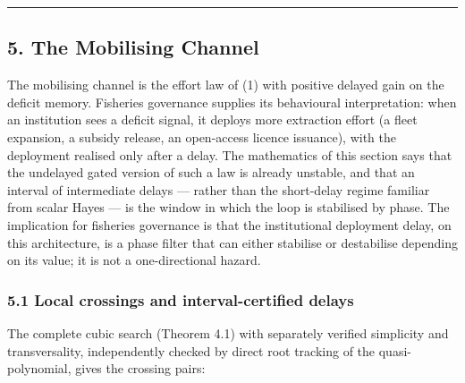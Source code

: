 \documentclass[11pt]{article}
\begin{document}
\begin{center}\rule{0.5\linewidth}{0.5pt}\end{center}

\subsection{5. The Mobilising Channel}\label{the-mobilising-channel}

The mobilising channel is the effort law of (1) with positive delayed
gain on the deficit memory. Fisheries governance supplies its
behavioural interpretation: when an institution sees a deficit signal,
it deploys more extraction effort (a fleet expansion, a subsidy release,
an open-access licence issuance), with the deployment realised only
after a delay. The mathematics of this section says that the undelayed
gated version of such a law is already unstable, and that an interval of
intermediate delays --- rather than the short-delay regime familiar from
scalar Hayes --- is the window in which the loop is stabilised by phase.
The implication for fisheries governance is that the institutional
deployment delay, on this architecture, is a phase filter that can
either stabilise or destabilise depending on its value; it is not a
one-directional hazard.

\subsubsection{5.1 Local crossings and interval-certified
delays}\label{local-crossings-and-interval-certified-delays}

The complete cubic search (Theorem 4.1) with separately verified
simplicity and transversality, independently checked by direct root
tracking of the quasi-polynomial, gives the crossing pairs:
\end{document}
